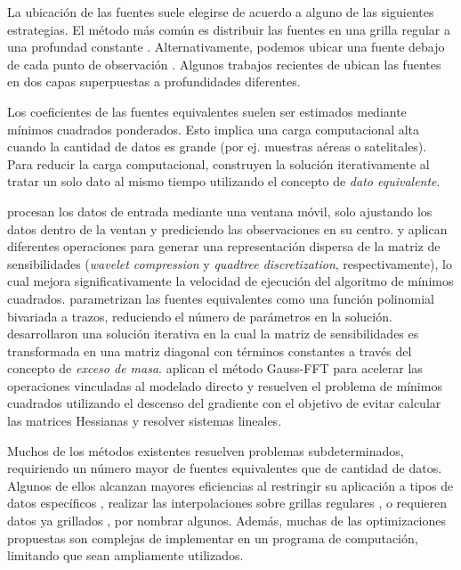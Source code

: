 La ubicación de las fuentes suele elegirse de acuerdo a alguno de las
siguientes estrategias.
El método más común es distribuir las fuentes en una grilla regular a una
profundad constante \citep[por~ej.,~][]{leao1989, barnes2011, oliveira2013}.
Alternativamente, podemos ubicar una fuente debajo de cada punto de observación
\citep[por~ej.,~][]{cordell1992, siqueira2017}.
Algunos trabajos recientes de \citet{li2020} ubican las fuentes en dos capas
superpuestas a profundidades diferentes.

Los coeficientes de las fuentes equivalentes suelen ser estimados mediante
mínimos cuadrados ponderados.
Esto implica una carga computacional alta cuando la cantidad de datos es grande
(por ej. muestras aéreas o satelitales).
Para reducir la carga computacional, \citet{mendonca1994} construyen la
solución iterativamente al tratar un solo dato al mismo tiempo utilizando el
concepto de \emph{dato equivalente}.

\citet{leao1989} procesan los datos de entrada mediante una ventana móvil, solo
ajustando los datos dentro de la ventan y prediciendo las observaciones en su
centro.
\citet{li2010} y \citet{barnes2011} aplican diferentes operaciones para generar
una representación dispersa de la matriz de sensibilidades (\emph{wavelet
compression} y \emph{quadtree discretization}, respectivamente), lo cual mejora
significativamente la velocidad de ejecución del algoritmo de mínimos
cuadrados.
\citet{oliveira2013} parametrizan las fuentes equivalentes como una función
polinomial bivariada a trazos, reduciendo el número de parámetros en la
solución.
\citet{siqueira2017} desarrollaron una solución iterativa en la cual la matriz
de sensibilidades es transformada en una matriz diagonal con términos
constantes a través del concepto de \emph{exceso de masa}.
\citet{jirigalatu2019} aplican el método Gauss-FFT para acelerar las
operaciones vinculadas al modelado directo y resuelven el problema de mínimos
cuadrados utilizando el descenso del gradiente con el objetivo de evitar
calcular las matrices Hessianas y resolver sistemas lineales.


Muchos de los métodos existentes resuelven problemas subdeterminados,
requiriendo un número mayor de fuentes equivalentes que de cantidad de datos.
Algunos de ellos alcanzan mayores eficiencias al
restringir su aplicación a tipos de datos específicos \citep{siqueira2017},
realizar las interpolaciones sobre grillas regulares \citep{leao1989},
o requieren datos ya grillados \citep{takahashi2020},
por nombrar algunos.
Además, muchas de las optimizaciones propuestas son complejas de implementar en
un programa de computación, limitando que sean ampliamente utilizados.

